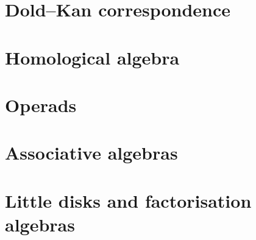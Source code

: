 \documentclass{article}
\begin{document}
\section{Dold--Kan correspondence}



\section{Homological algebra}



\section{Operads}

\nyw

\section{Associative algebras}

\nyw

\section{Little disks and factorisation algebras}

\nyw


\end{document}
